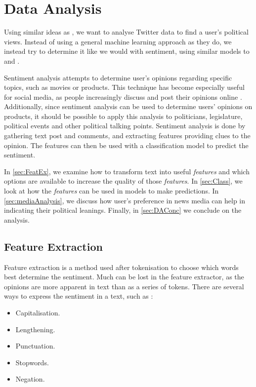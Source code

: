 \chapter{Data Analysis}\label{cha:DA}
Using similar ideas as , we want to analyse
Twitter data to find a user's political views. Instead of using a general
machine learning approach as they do, we instead try to determine it like we
would with sentiment, using similar models to  and
.\nl

Sentiment analysis attempts to determine user's opinions regarding specific
topics, such as movies or products. This technique has become especially useful
for social media, as people increasingly discuss and post their opinions online
\citep[Overview 2]{Sentiment}. Additionally, since sentiment analysis can be
used to determine users' opinions on products, it should be possible to apply
this analysis to politicians, legislature, political events and other political
talking points. Sentiment analysis is done by gathering text post and comments,
and extracting features providing clues to the opinion. The features can then
be used with a classification model to predict the sentiment.\nl

In \autoref{sec:FeatEx}, we examine how to transform text into useful
\textit{features} and which options are available to increase the quality of
those \textit{features}. In \autoref{sec:Class}, we look at how the
\textit{features} can be used in models to make predictions. In
\autoref{sec:mediaAnalysis}, we discuss how user's preference in news media can
help in indicating their political leanings. Finally, in \autoref{sec:DAConc} we
conclude on the analysis.

\section{Feature Extraction}\label{sec:FeatEx}
Feature extraction is a method used after tokenisation to choose which
words best determine the sentiment. Much can be lost in the feature extractor,
as the opinions are more apparent in text than as a series of tokens. There are
several ways to express the sentiment in a text, such
as \citep[Overview 3-4]{Sentiment}:


\begin{itemize}
  \item Capitalisation. 
  \item Lengthening.
  \item Punctuation.
  \item Stopwords.
  \item Negation.
\end{itemize}

